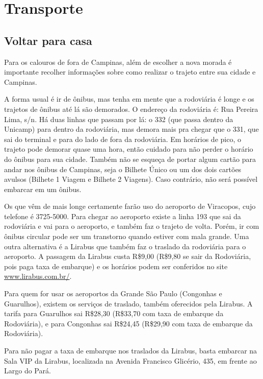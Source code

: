 
\section{Transporte}
\subsection{Voltar para casa}

Para os calouros de fora de Campinas, além de escolher a nova morada é
importante recolher informações sobre como realizar o trajeto entre sua cidade e
Campinas.

A forma usual é ir de ônibus, mas tenha em mente que a rodoviária é longe e os
trajetos de ônibus até lá são demorados. O endereço da rodoviária é: Rua Pereira 
Lima, s/n. Há duas linhas que passam por lá: o 332 (que passa dentro da
Unicamp) para dentro da rodoviária, mas demora mais pra chegar que o 331, que
sai do terminal e para do lado de fora da rodoviária. Em horários de pico, o
trajeto pode demorar quase uma hora, então cuidado para não perder o horário do
ônibus para sua cidade. Também não se esqueça de portar algum cartão para 
andar nos ônibus de Campinas, seja o Bilhete Único ou um dos dois cartões avulsos
(Bilhete 1 Viagem e Bilhete 2 Viagens). Caso contrário, não será possível embarcar 
em um ônibus.

Os que vêm de mais longe certamente farão uso do aeroporto de Viracopos, cujo
telefone é 3725-5000. Para chegar ao aeroporto existe a linha 193 que sai da
rodoviária e vai para o aeroporto, e também faz o trajeto de volta. Porém, ir com
ônibus circular pode ser um transtorno quando estiver com mala grande. Uma outra
alternativa é a Lirabus que também faz o traslado da rodoviária para o
aeroporto. A passagem da Lirabus custa R\$9,00 (R\$9,80 se sair da Rodoviária,
pois paga taxa de embarque) e os horários podem ser conferidos no site
\url{www.lirabus.com.br/}.

Para quem for usar os aeroportos da Grande São Paulo (Congonhas e Guarulhos),
existem os serviços de traslado, também oferecidos pela Lirabus. A tarifa para
Guarulhos sai R\$28,30 (R\$33,70 com taxa de embarque da Rodoviária), e para 
Congonhas sai R\$24,45 (R\$29,90 com taxa de embarque da Rodoviária).

Para não pagar a taxa de embarque nos traslados da Lirabus, basta embarcar 
na Sala VIP da Lirabus, localizada na Avenida Francisco Glicério, 435,
em frente ao Largo do Pará.


